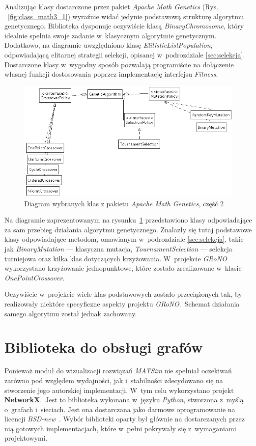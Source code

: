 \documentclass[twoside,12pt]{report}
\begin{document}
Analizując klasy dostarczone przez pakiet \textit{Apache Math Genetics} (Rys. ~\ref{fig:class_math3_1}) wyraźnie widać jedynie podstawową strukturę algorytmu genetycznego. Biblioteka dysponuje oczywiście klasą \textit{BinaryChromosome}, który idealnie spełnia swoje zadanie w~klasycznym algorytmie genetycznym. Dodatkowo, na diagramie uwzględniono klasę \textit{ElitisticListPopulation}, odpowiadającą elitarnej strategii selekcji, opisanej w~podrozdziale \ref{sec:selekcja}. Dostarczone klasy w~wygodny sposób pozwalają programiście na dołączenie własnej funkcji dostosowania poprzez implementację interfejsu \textit{Fitness}.

\begin{figure}[htbp]
	\centering
	\includegraphics[width=\textwidth]{img/math3-2}
	\caption{Diagram wybranych klas z pakietu \textit{Apache Math Genetics}, część 2}
	\label{fig:class_math3_2}
\end{figure}

Na diagramie zaprezentowanym na rysunku~\ref{fig:class_math3_2} przedstawiono klasy odpowiadające za sam przebieg działania algorytmu genetycznego. Znalazły się tutaj podstawowe klasy odpowiadające metodom, omawianym w~podrozdziale \ref{sec:selekcja}, takie jak \textit{BinaryMutation} --- klasyczna mutacja, \textit{TournamentSelection} --- selekcja turniejowa oraz kilka klas dotyczących krzyżowania. W~projekcie \textit{GRoNO} wykorzystano krzyżowanie jednopunktowe, które zostało zrealizowane w~klasie \textit{OnePointCrossover}.

Oczywiście w~projekcie wiele klas podstawowych zostało przeciążonych tak, by realizowały niektóre specyficzne aspekty projektu \textit{GRoNO}.~Schemat działania samego algorytmu został jednak zachowany.

\section{Biblioteka do obsługi grafów}\label{rozdz.obsluga_grafow}
Ponieważ moduł do wizualizacji rozwiązań \textit{MATSim} nie spełniał  oczekiwań zarówno pod względem wydajności, jak i~stabilności zdecydowano się na stworzenie jego autorskiej implementacji. W~tym celu wykorzystano projekt \textbf{NetworkX}.~Jest to biblioteka wykonana w~języku \textit{Python}, stworzona z~myślą o~grafach i~sieciach. Jest ona dostarczana jako darmowe oprogramowanie na licencji \textit{BSD-new}~\cite{networkx}. Wybór biblioteki oparty był głównie na dostarczanych przez nią gotowych implementacjach, które w~pełni pokrywały się z~wymaganiami projektowymi.
\end{document}
